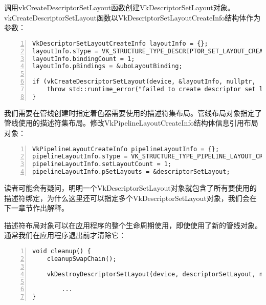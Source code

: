 \documentclass{ctexart}
\begin{document}
调用vkCreateDescriptorSetLayout函数创建VkDescriptorSetLayout对象。vkCreateDescriptorSetLayout函数以VkDescriptorSetLayoutCreateInfo结构体作为参数：

\begin{lstlisting}[language={[ANSI]C},keywordstyle=\color{blue!70},commentstyle=\color{red!50!green!50!blue!50},frame=shadowbox, rulesepcolor=\color{red!20!green!20!blue!20},basicstyle=\small,numbers=left, numberstyle=\tiny,breaklines=true]
VkDescriptorSetLayoutCreateInfo layoutInfo = {};
layoutInfo.sType = VK_STRUCTURE_TYPE_DESCRIPTOR_SET_LAYOUT_CREATE_INFO;
layoutInfo.bindingCount = 1;
layoutInfo.pBindings = &uboLayoutBinding;

if (vkCreateDescriptorSetLayout(device, &layoutInfo, nullptr,	 &descriptorSetLayout) != VK_SUCCESS) {
	throw std::runtime_error("failed to create descriptor set layout!");
}
\end{lstlisting}

我们需要在管线创建时指定着色器需要使用的描述符集布局。管线布局对象指定了管线使用的描述符集布局。修改VkPipelineLayoutCreateInfo结构体信息引用布局对象：

\begin{lstlisting}[language={[ANSI]C},keywordstyle=\color{blue!70},commentstyle=\color{red!50!green!50!blue!50},frame=shadowbox, rulesepcolor=\color{red!20!green!20!blue!20},basicstyle=\small,numbers=left, numberstyle=\tiny,breaklines=true]
VkPipelineLayoutCreateInfo pipelineLayoutInfo = {};
pipelineLayoutInfo.sType = VK_STRUCTURE_TYPE_PIPELINE_LAYOUT_CREATE_INFO;
pipelineLayoutInfo.setLayoutCount = 1;
pipelineLayoutInfo.pSetLayouts = &descriptorSetLayout;
\end{lstlisting}

读者可能会有疑问，明明一个VkDescriptorSetLayout对象就包含了所有要使用的描述符绑定，为什么这里还可以指定多个VkDescriptorSetLayout对象，我们会在下一章节作出解释。

描述符布局对象可以在应用程序的整个生命周期使用，即使使用了新的管线对象。通常我们在应用程序退出前才清除它：

\begin{lstlisting}[language={[ANSI]C},keywordstyle=\color{blue!70},commentstyle=\color{red!50!green!50!blue!50},frame=shadowbox, rulesepcolor=\color{red!20!green!20!blue!20},basicstyle=\small,numbers=left, numberstyle=\tiny,breaklines=true]
void cleanup() {
	cleanupSwapChain();

	vkDestroyDescriptorSetLayout(device, descriptorSetLayout, nullptr);

		...
}
\end{lstlisting}
\end{document}
